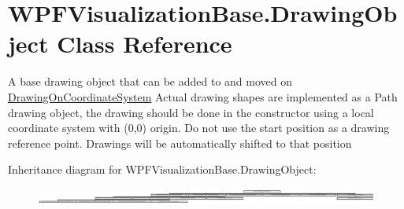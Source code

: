 \hypertarget{class_w_p_f_visualization_base_1_1_drawing_object}{}\section{W\+P\+F\+Visualization\+Base.\+Drawing\+Object Class Reference}
\label{class_w_p_f_visualization_base_1_1_drawing_object}


A base drawing object that can be added to and moved on \hyperlink{class_w_p_f_visualization_base_1_1_drawing_on_coordinate_system}{Drawing\+On\+Coordinate\+System} Actual drawing shapes are implemented as a Path drawing object, the drawing should be done in the constructor using a local coordinate system with (0,0) origin. Do not use the start position as a drawing reference point. Drawings will be automatically shifted to that position  


Inheritance diagram for W\+P\+F\+Visualization\+Base.\+Drawing\+Object\+:\begin{figure}[H]
\begin{center}
\leavevmode
\includegraphics[height=0.525082cm]{class_w_p_f_visualization_base_1_1_drawing_object}
\end{center}
\end{figure}
